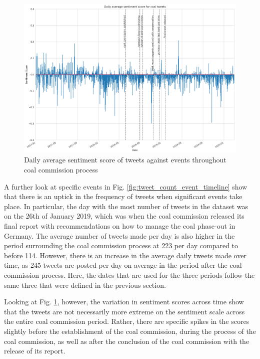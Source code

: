 \documentclass[12pt,onecolumn,twoside]{layout}
\begin{document}
\begin{figure} 
	\begin{center}
		\includegraphics[width=\textwidth]{figures/sa_tweet_score_event_timeline3}
	\end{center}
	\caption{Daily average sentiment score of tweets against events throughout coal commission process}
	\label{fig:tweet_score_event_timeline}
\end{figure}

A further look at specific events in Fig. \ref{fig:tweet_count_event_timeline} show that there is an uptick in the frequency of tweets when significant events take place. In particular, the day with the most number of tweets in the dataset was on the 26th of January 2019, which was when the coal commission released its final report with recommendations on how to manage the coal phase-out in Germany. The average number of tweets made per day is also higher in the period surrounding the coal commission process at 223 per day compared to before 114. However, there is an increase in the average daily tweets made over time, as 245 tweets are posted per day on average in the period after the coal commission process. Here, the dates that are used for the three periods follow the same three that were defined in the previous section. 

Looking at Fig. \ref{fig:tweet_score_event_timeline}, however, the variation in sentiment scores across time show that the tweets are not necessarily more extreme on the sentiment scale across the entire coal commission period. Rather, there are specific spikes in the scores slightly before the establishment of the coal commission, during the process of the coal commission, as well as after the conclusion of the coal commission with the release of its report. 
\end{document}
